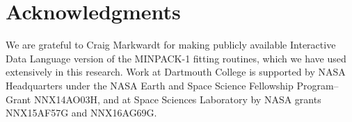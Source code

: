 
  \section*{Acknowledgments}

  We are grateful to Craig Markwardt for making publicly available \DIFdelbegin {}\DIFdelend \DIFaddbegin {}\DIFaddend Interactive Data Language version of the MINPACK-1 fitting routines, which we
  have used extensively in this research. Work at Dartmouth College is supported
  by NASA Headquarters under the NASA Earth and Space Science Fellowship
  Program--Grant NNX14AO03H, and at Space Sciences Laboratory by NASA grants
  NNX15AF57G and NNX16AG69G.



